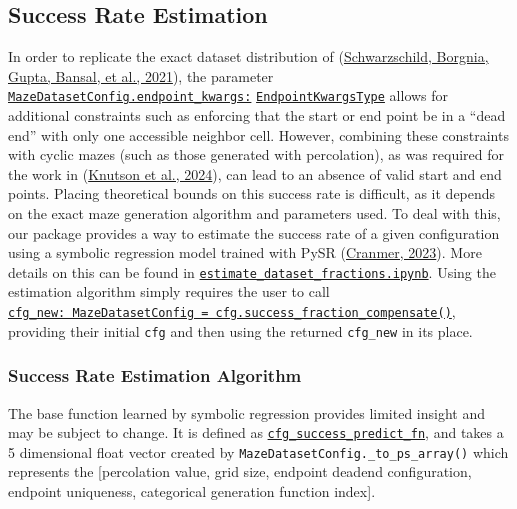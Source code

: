 \documentclass[10pt,a4paper,onecolumn]{article}
\begin{document}
\hypertarget{sec:success-rate-estimation}{%
\subsection{Success Rate Estimation}\label{sec:success-rate-estimation}}

In order to replicate the exact dataset distribution of
(\protect\hyperlink{ref-easy_to_hard}{Schwarzschild, Borgnia, Gupta,
Bansal, et al., 2021}), the parameter
\href{https://understanding-search.github.io/maze-dataset/maze_dataset/dataset/maze_dataset_config.html\#MazeDatasetConfig.endpoint_kwargs}{\texttt{MazeDatasetConfig.endpoint\_kwargs:}}
\href{https://understanding-search.github.io/maze-dataset/maze_dataset/dataset/maze_dataset_config.html\#EndpointKwargsType}{\texttt{EndpointKwargsType}}
allows for additional constraints such as enforcing that the start or
end point be in a ``dead end'' with only one accessible neighbor cell.
However, combining these constraints with cyclic mazes (such as those
generated with percolation), as was required for the work in
(\protect\hyperlink{ref-knutson2024logicalextrapolation}{Knutson et al.,
2024}), can lead to an absence of valid start and end points. Placing
theoretical bounds on this success rate is difficult, as it depends on
the exact maze generation algorithm and parameters used. To deal with
this, our package provides a way to estimate the success rate of a given
configuration using a symbolic regression model trained with PySR
(\protect\hyperlink{ref-pysr}{Cranmer, 2023}). More details on this can
be found in
\href{https://understanding-search.github.io/maze-dataset/notebooks/estimate_dataset_fractions.html}{\texttt{estimate\_dataset\_fractions.ipynb}}.
Using the estimation algorithm simply requires the user to call
\href{https://understanding-search.github.io/maze-dataset/maze_dataset.html\#MazeDatasetConfig.success_fraction_compensate}{\texttt{cfg\_new:\ MazeDatasetConfig\ =\ cfg.success\_fraction\_compensate()}},
providing their initial \texttt{cfg} and then using the returned
\texttt{cfg\_new} in its place.

\hypertarget{success-rate-estimation-algorithm}{%
\subsubsection{Success Rate Estimation
Algorithm}\label{success-rate-estimation-algorithm}}

The base function learned by symbolic regression provides limited
insight and may be subject to change. It is defined as
\href{https://understanding-search.github.io/maze-dataset/maze_dataset/dataset/success_predict_math.html\#cfg_success_predict_fn}{\texttt{cfg\_success\_predict\_fn}},
and takes a 5 dimensional float vector created by
\texttt{MazeDatasetConfig.\_to\_ps\_array()} which represents the
{[}percolation value, grid size, endpoint deadend configuration,
endpoint uniqueness, categorical generation function index{]}.
\end{document}
